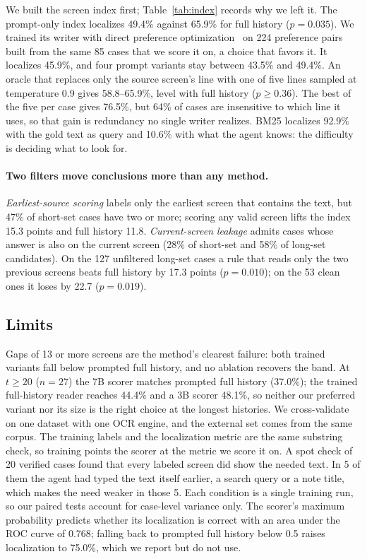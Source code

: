 We built the screen index first; Table~\ref{tab:index} records why we left it. The prompt-only index localizes 49.4\% against 65.9\% for full history ($p=0.035$). We trained its writer with direct preference optimization~\citep{dpo} on 224 preference pairs built from the same 85 cases that we score it on, a choice that favors it. It localizes 45.9\%, and four prompt variants stay between 43.5\% and 49.4\%. An oracle that replaces only the source screen's line with one of five lines sampled at temperature 0.9 gives 58.8--65.9\%, level with full history ($p\ge0.36$). The best of the five per case gives 76.5\%, but 64\% of cases are insensitive to which line it uses, so that gain is redundancy no single writer realizes. BM25 localizes 92.9\% with the gold text as query and 10.6\% with what the agent knows: the difficulty is deciding what to look for.

\paragraph{Two filters move conclusions more than any method.} \emph{Earliest-source scoring} labels only the earliest screen that contains the text, but 47\% of short-set cases have two or more; scoring any valid screen lifts the index 15.3 points and full history 11.8. \emph{Current-screen leakage} admits cases whose answer is also on the current screen (28\% of short-set and 58\% of long-set candidates). On the 127 unfiltered long-set cases a rule that reads only the two previous screens beats full history by 17.3 points ($p=0.010$); on the 53 clean ones it loses by 22.7 ($p=0.019$).

\subsection{Limits}
\label{sec:limits}
Gaps of 13 or more screens are the method's clearest failure: both trained variants fall below prompted full history, and no ablation recovers the band. At $t\ge20$ ($n=27$) the 7B scorer matches prompted full history (37.0\%); the trained full-history reader reaches 44.4\% and a 3B scorer 48.1\%, so neither our preferred variant nor its size is the right choice at the longest histories. We cross-validate on one dataset with one OCR engine, and the external set comes from the same corpus. The training labels and the localization metric are the same substring check, so training points the scorer at the metric we score it on. A spot check of 20 verified cases found that every labeled screen did show the needed text. In 5 of them the agent had typed the text itself earlier, a search query or a note title, which makes the need weaker in those 5. Each condition is a single training run, so our paired tests account for case-level variance only. The scorer's maximum probability predicts whether its localization is correct with an area under the ROC curve of 0.768; falling back to prompted full history below 0.5 raises localization to 75.0\%, which we report but do not use.
